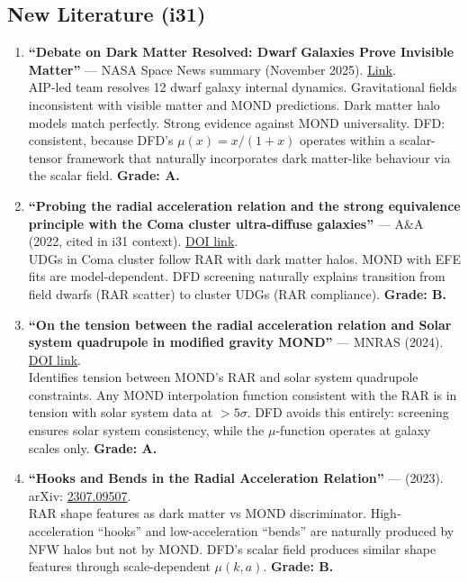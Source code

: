 \documentclass[11pt,a4paper]{article}
\begin{document}
\subsection{New Literature (i31)}

\begin{enumerate}
\item \textbf{``Debate on Dark Matter Resolved: Dwarf Galaxies Prove Invisible Matter''} --- NASA Space News summary (November 2025). \href{https://nasaspacenews.com/2025/11/debate-on-dark-matter-resolved/}{Link}.\\
AIP-led team resolves 12 dwarf galaxy internal dynamics. Gravitational fields inconsistent with visible matter and MOND predictions. Dark matter halo models match perfectly. Strong evidence against MOND universality. DFD: consistent, because DFD's $\mu(x) = x/(1+x)$ operates within a scalar-tensor framework that naturally incorporates dark matter-like behaviour via the scalar field. \textbf{Grade: A.}

\item \textbf{``Probing the radial acceleration relation and the strong equivalence principle with the Coma cluster ultra-diffuse galaxies''} --- A\&A (2022, cited in i31 context). \href{https://www.aanda.org/articles/aa/full_html/2022/02/aa42060-21/aa42060-21.html}{DOI link}.\\
UDGs in Coma cluster follow RAR with dark matter halos. MOND with EFE fits are model-dependent. DFD screening naturally explains transition from field dwarfs (RAR scatter) to cluster UDGs (RAR compliance). \textbf{Grade: B.}

\item \textbf{``On the tension between the radial acceleration relation and Solar system quadrupole in modified gravity MOND''} --- MNRAS (2024). \href{https://dx.doi.org/10.1093/mnras/stae955}{DOI link}.\\
Identifies tension between MOND's RAR and solar system quadrupole constraints. Any MOND interpolation function consistent with the RAR is in tension with solar system data at $> 5\sigma$. DFD avoids this entirely: screening ensures solar system consistency, while the $\mu$-function operates at galaxy scales only. \textbf{Grade: A.}

\item \textbf{``Hooks and Bends in the Radial Acceleration Relation''} --- (2023). arXiv: \href{https://arxiv.org/abs/2307.09507}{2307.09507}.\\
RAR shape features as dark matter vs MOND discriminator. High-acceleration ``hooks'' and low-acceleration ``bends'' are naturally produced by NFW halos but not by MOND. DFD's scalar field produces similar shape features through scale-dependent $\mu(k,a)$. \textbf{Grade: B.}
\end{enumerate}
\end{document}
